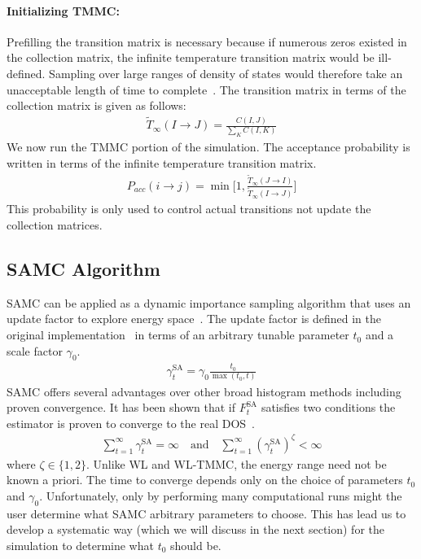 \documentclass[letterpaper,twocolumn,amsmath,amssymb,pre,aps,10pt]{revtex4-1}
\begin{document}
\paragraph{Initializing TMMC:} Prefilling the transition
matrix is necessary because if numerous zeros existed in the collection
matrix, the infinite temperature transition matrix would be
ill-defined.  Sampling over large ranges of density of states would
therefore take an unacceptable length of time to
complete~\cite{shell2003improved, shen2014elucidating}.  The transition
matrix in terms of the collection matrix is given as
follows:
\begin{align}
\widetilde{T}_{\infty}(I\rightarrow J) = \frac{C(I,J)}
{\sum_{K} C(I,K)}
\end{align}
We now run the TMMC portion of the simulation.
The acceptance probability is written in terms of the infinite temperature
transition matrix.
\begin{align}
  P_{acc}(i\rightarrow j) = \min\bigg[1,\frac{\widetilde{T}_{\infty}(J\rightarrow I)}
  {\widetilde{T}_{\infty}(I\rightarrow J)}\bigg]
\end{align}
This probability is only used to control actual transitions not update
the collection matrices.

\subsection{SAMC Algorithm}
SAMC can be applied as a dynamic importance sampling algorithm that
uses an update factor to explore energy
space~\cite{liang2007stochastic, werlich2015stochastic,
schneider2017convergence}.  The update factor is defined in the
original implementation~\cite{liang2007stochastic} in terms of an
arbitrary tunable parameter $t_0$ and a scale factor $\gamma_0$.
\begin{align}
\gamma_{t}^{\text{SA}} =\gamma_0 \frac{t_0}{\max(t_0,t)}
\end{align}
SAMC offers several advantages over other broad histogram methods
including proven convergence. It has been shown that if
$F_{t}^{\text{SA}}$ satisfies two conditions the estimator is proven to
converge to the real DOS~\cite{liang2006theory, liang2007stochastic}.
\begin{align}
\sum_{t=1}^\infty \gamma_{t}^{\text{SA}} = \infty \quad\textrm{and}\quad
\sum_{t=1}^\infty (\gamma_{t}^{\text{SA}})^\zeta < \infty
\end{align}
where $\zeta \in \{1,2\}$.  Unlike WL and WL-TMMC, the energy range need
not be known a priori.  The time to converge depends only on the choice of
parameters $t_0$ and $\gamma_0$.
Unfortunately, only by performing many computational runs might the user
determine what SAMC arbitrary parameters to choose.  This has lead us
to develop a systematic way (which we will discuss in the next section)
for the simulation to determine what $t_0$ should be.
\end{document}
